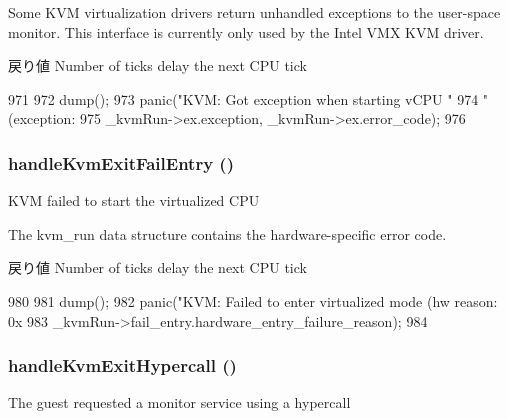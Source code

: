 Some KVM virtualization drivers return unhandled exceptions to the user-\/space monitor. This interface is currently only used by the Intel VMX KVM driver.

\begin{DoxyReturn}{戻り値}
Number of ticks delay the next CPU tick 
\end{DoxyReturn}



\begin{DoxyCode}
971 {
972     dump();
973     panic("KVM: Got exception when starting vCPU "
974           "(exception: %
975           _kvmRun->ex.exception, _kvmRun->ex.error_code);
976 }
\end{DoxyCode}
\hypertarget{classBaseKvmCPU_a0dfcd253bad58e13a071f638d6638b1e}{
\subsubsection[{handleKvmExitFailEntry}]{ handleKvmExitFailEntry ()}}
\label{classBaseKvmCPU_a0dfcd253bad58e13a071f638d6638b1e}
KVM failed to start the virtualized CPU

The kvm\_\-run data structure contains the hardware-\/specific error code.

\begin{DoxyReturn}{戻り値}
Number of ticks delay the next CPU tick 
\end{DoxyReturn}



\begin{DoxyCode}
980 {
981     dump();
982     panic("KVM: Failed to enter virtualized mode (hw reason: 0x%
983           _kvmRun->fail_entry.hardware_entry_failure_reason);
984 }
\end{DoxyCode}
\hypertarget{classBaseKvmCPU_a32523a85b6259326f71aea298ae96ff6}{
\subsubsection[{handleKvmExitHypercall}]{ handleKvmExitHypercall ()}}
\label{classBaseKvmCPU_a32523a85b6259326f71aea298ae96ff6}
The guest requested a monitor service using a hypercall

